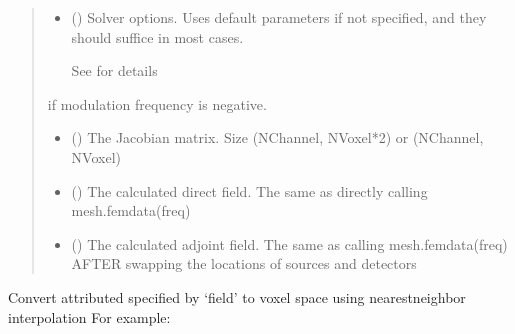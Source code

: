 \documentclass[letterpaper,10pt,english]{sphinxmanual}
\begin{document}
\begin{fulllineitems}
\begin{fulllineitems}
\begin{quote}
\begin{description}
\begin{itemize}
\item {} 
\sphinxAtStartPar
{} ({\hyperref[\detokenize{_autosummary/nirfasterff.utils.SolverOptions:nirfasterff.utils.SolverOptions}]{}}\sphinxstyleliteralemphasis{\sphinxupquote{, }}) \textendash{} 
\sphinxAtStartPar
Solver options. Uses default parameters if not specified, and they should suffice in most cases.

\sphinxAtStartPar
See {\hyperref[\detokenize{_autosummary/nirfasterff.utils.SolverOptions:nirfasterff.utils.SolverOptions}]{}} for details


\end{itemize}

\sphinxAtStartPar
{} \textendash{} if modulation frequency is negative.

\sphinxAtStartPar
\begin{itemize}
\item {} 
\sphinxAtStartPar
{} () \textendash{} The Jacobian matrix. Size (NChannel, NVoxel*2) or (NChannel, NVoxel)

\item {} 
\sphinxAtStartPar
{} () \textendash{} The calculated direct field. The same as directly calling mesh.femdata(freq)

\item {} 
\sphinxAtStartPar
{} () \textendash{} The calculated adjoint field. The same as calling mesh.femdata(freq) AFTER swapping the locations of sources and detectors

\end{itemize}


\end{description}\end{quote}

\end{fulllineitems}


\begin{fulllineitems}
\label{\detokenize{_autosummary/nirfasterff.base.fluor_mesh.fluormesh:nirfasterff.base.fluor_mesh.fluormesh.nntogrid}}
\pysigstartsignatures
\pysiglinewithargsret
{}
{}
{}
\pysigstopsignatures
\sphinxAtStartPar
Convert attributed specified by ‘field’ to voxel space using nearest\sphinxhyphen{}neighbor interpolation
For example:
\begin{quote}


\end{quote}
\end{fulllineitems}
\end{fulllineitems}
\end{document}
